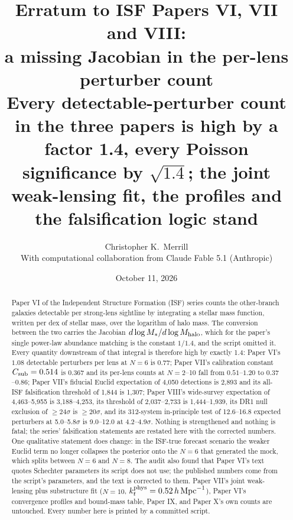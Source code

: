 \documentclass[twocolumn,11pt]{article}
\newcommand{\Csub}{C_{\rm sub}}
\begin{document}
\title{Erratum to ISF Papers VI, VII and VIII:\\
a missing Jacobian in the per-lens perturber count\\[0.3em]
\large Every detectable-perturber count in the three papers is high by
a factor 1.4, every Poisson significance by $\sqrt{1.4}$; the joint
weak-lensing fit, the profiles and the falsification logic stand}

\author{Christopher K.\ Merrill\\[0.3em]
{\small With computational collaboration from Claude Fable 5.1 (Anthropic)}}
\date{October 11, 2026}

\maketitle

\begin{abstract}
Paper VI of the Independent Structure Formation (ISF) series counts the
other-branch galaxies detectable per strong-lens sightline by
integrating a stellar mass function, written per dex of stellar mass,
over the logarithm of halo mass. The conversion between the two carries
the Jacobian $d\log M_\ast/d\log M_{\rm halo}$, which for the paper's
single power-law abundance matching is the constant $1/1.4$, and the
script omitted it. Every quantity downstream of that integral is
therefore high by exactly 1.4: Paper VI's $1.08$ detectable perturbers
per lens at $N=6$ is $0.77$; Paper VII's calibration constant
$\Csub=0.514$ is $0.367$ and its per-lens counts at $N=2$--10 fall from
$0.51$--$1.20$ to $0.37$--$0.86$; Paper VII's fiducial Euclid
expectation of 4,050 detections is 2,893 and its all-ISF falsification
threshold of 1,844 is 1,307; Paper VIII's wide-survey expectation of
4,463--5,955 is 3,188--4,253, its threshold of 2,037--2,733 is
1,444--1,939, its DR1 null exclusion of $\geq24\sigma$ is
$\geq20\sigma$, and its 312-system in-principle test of 12.6--16.8
expected perturbers at 5.0--5.8$\sigma$ is 9.0--12.0 at 4.2--4.9$\sigma$.
Nothing is strengthened and nothing is fatal; the series' falsification
statements are restated here with the corrected numbers. One
qualitative statement does change: in the ISF-true forecast scenario the
weaker Euclid term no longer collapses the posterior onto the $N=6$
that generated the mock, which splits between $N=6$ and $N=8$. The
audit also found that Paper VI's text quotes Schechter parameters its
script does not use; the published numbers come from the script's
parameters, and the text is corrected to them. Paper VII's joint
weak-lensing plus substructure fit ($N=10$, $k_t^{\rm phys}=0.52\,h\,{\rm
Mpc}^{-1}$), Paper VI's convergence profiles and bound-mass table, Paper
IX, and Paper X's own counts are untouched. Every number here is
printed by a committed script.
\end{abstract}
\end{document}
